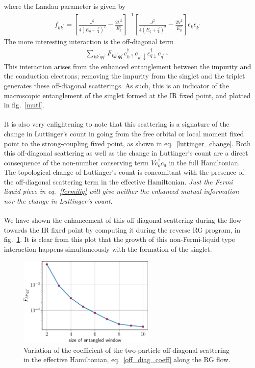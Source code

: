 \documentclass[twoside,11pt]{report}
\numberwithin{equation}{section}
\begin{document}
where the Landau parameter is given by
\begin{equation}\begin{aligned}
	\label{fermiliq}
	f_{kk^\prime} = \left[\frac{J^2}{4\left( E_g + \frac{J}{4} \right)^2} - \frac{2V^2}{E_g^2}\right]^{-1}\left[\frac{J^2}{4\left( E_g + \frac{J}{4} \right) ^3} - \frac{2V^2}{E_g^3}\right]\epsilon_k \epsilon_{k^\prime}
\end{aligned}\end{equation}
The more interesting interaction is the off-diagonal term
\begin{equation}\begin{aligned}
	 \sum_{kk^\prime q q^\prime} F_{kk^\prime qq^\prime}c^\dagger_{k \uparrow}c_{k^\prime \downarrow}c^\dagger_{q \downarrow}c_{q^\prime \uparrow}
\end{aligned}\end{equation}
This interaction arises from the enhanced entanglement between the impurity and the conduction electrons; removing the impurity from the singlet and the triplet generates these off-diagonal scatterings. As such, this is an indicator of the macroscopic entanglement of the singlet formed at the IR fixed point, and plotted in fig.~\ref{mutI}. 
\\\\It is also very enlightening to note that this scattering is a signature of the change in Luttinger's count in going from the free orbital or local moment fixed point to the strong-coupling fixed point, as shown in eq.~\ref{luttinger_change}. Both this off-diagonal scattering as well as the change in Luttinger's count are a direct consequence of the non-number conserving term \(V c^\dagger_{k} c_d\) in the full Hamiltonian. The topological change of Luttinger's count is concomitant with the presence of the off-diagonal scattering term in the effective Hamiltonian. \textit{Just the Fermi liquid piece in eq.~\ref{fermiliq} will give neither the enhanced mutual information nor the change in Luttinger's count}.
\\\\We have shown the enhancement of this off-diagonal scattering during the flow towards the IR fixed point by computing it during the reverse RG program, in fig.~\ref{Fkkqq}. It is clear from this plot that the growth of this non-Fermi-liquid type interaction happens simultaneously with the formation of the singlet.
\begin{figure}[htpb]
	\centering
	\includegraphics[width=0.6\textwidth]{../figures/Fkkqq.pdf}
	\caption{Variation of the coefficient of the two-particle off-diagonal scattering in the effective Hamiltonian, eq.~\ref{off_diag_coeff} along the RG flow.}
	\label{Fkkqq}
\end{figure}
\end{document}
